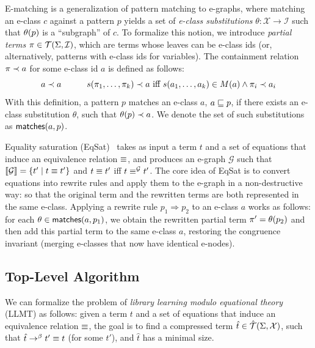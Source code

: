 %
E-matching is a generalization of pattern matching to e-graphs,
where matching an e-class $c$ against a pattern $p$ yields a set of \emph{e-class substitutions} 
$\theta\colon \mathcal{X}\to \mathcal{I}$
such that ${\theta}({p})$ is a ``subgraph'' of $c$.
%
To formalize this notion, we introduce \emph{partial terms} $\pi \in \mathcal{T}(\Sigma,\mathcal{I})$,
which are terms whose leaves can be e-class ids
(or, alternatively, patterns with e-class ids for variables).
%
The containment relation ${\pi} \prec {a}$ for some e-class id $a$ is defined as follows:
$$
{a} \prec {a} \quad\quad\quad
{s(\pi_1, \ldots, \pi_k)} \prec {a}\ \text{iff}\ s(a_1, \ldots, a_k) \in M(a) \wedge {\pi_i} \prec {a_i}
$$
%
With this definition, a pattern $p$ matches an e-class $a$, $a \sqsubseteq p$, if there exists an e-class substitution $\theta$,
such that ${{\theta}({p})} \prec {a}$.
%
We denote the set of such substitutions as $\mathsf{matches}(a,p)$.

%
Equality saturation (EqSat)~\cite{tate2009equality,willsey2021egg} 
takes as input a term $t$ and a set of equations that induce an equivalence relation $\equiv$,
and produces an e-graph $\mathcal{G}$ such that $\llbracket \mathcal{G} \rrbracket = \{t' \mid t \equiv t'\}$
and $t \equiv t'$ iff $t \equiv^{\mathcal{G}} t'$.
%
The core idea of EqSat is to convert equations into rewrite rules
and apply them to the e-graph in a non-destructive way:
so that the original term and the rewritten terms are both represented in the same e-class.
%
Applying a rewrite rule $p_1 \Rightarrow p_2$ to an e-class $a$ works as follows:
for each $\theta \in \mathsf{matches}(a,p_1)$, 
we obtain the rewritten partial term $\pi' = {\theta}({p_2})$
and then add this partial term to the same e-class $a$,
restoring the congruence invariant
(\ie merging e-classes that now have identical e-nodes).

\subsection{Top-Level Algorithm}



We can formalize the problem of \emph{library learning modulo equational theory} (LLMT) as follows:
given a term $t$ and a set of equations that induce an equivalence relation $\equiv$,
the goal is to find a compressed term $\hat{t} \in \hat{\mathcal{T}}(\Sigma,\mathcal{X})$,
such that $\hat{t} \rightarrow^{\beta} t' \equiv t$ (for some $t'$),
and $\hat{t}$ has a minimal size.

